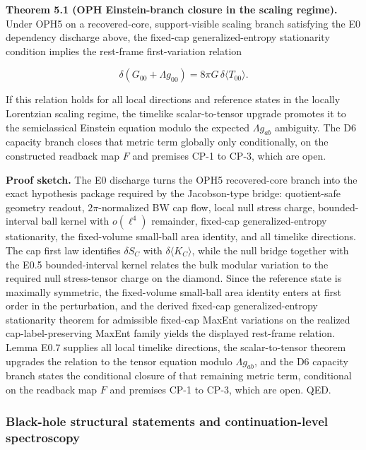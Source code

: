 \textbf{Theorem 5.1 (OPH Einstein-branch closure in the scaling regime).} Under OPH5 on a recovered-core, support-visible scaling branch satisfying the E0 dependency discharge above, the fixed-cap generalized-entropy stationarity condition implies the rest-frame first-variation relation

\[
\delta\!\left(G_{00}+\Lambda g_{00}\right)=8\pi G\,\delta\langle T_{00}\rangle.
\]

If this relation holds for all local directions and reference states in the locally Lorentzian scaling regime, the timelike scalar-to-tensor upgrade promotes it to the semiclassical Einstein equation modulo the expected \(\Lambda g_{ab}\) ambiguity. The D6 capacity branch closes that metric term globally only conditionally, on the constructed readback map \(F\) and premises CP-1 to CP-3, which are open.

\textbf{Proof sketch.} The E0 discharge turns the OPH5 recovered-core branch into the exact hypothesis package required by the Jacobson-type bridge: quotient-safe geometry readout, \(2\pi\)-normalized BW cap flow, local null stress charge, bounded-interval ball kernel with \(o(\ell^4)\) remainder, fixed-cap generalized-entropy stationarity, the fixed-volume small-ball area identity, and all timelike directions. The cap first law identifies \(\delta S_C\) with \(\delta\langle K_C\rangle\), while the null bridge together with the E0.5 bounded-interval kernel relates the bulk modular variation to the required null stress-tensor charge on the diamond. Since the reference state is maximally symmetric, the fixed-volume small-ball area identity enters at first order in the perturbation, and the derived fixed-cap generalized-entropy stationarity theorem for admissible fixed-cap MaxEnt variations on the realized cap-label-preserving MaxEnt family yields the displayed rest-frame relation. Lemma E0.7 supplies all local timelike directions, the scalar-to-tensor theorem upgrades the relation to the tensor equation modulo \(\Lambda g_{ab}\), and the D6 capacity branch states the conditional closure of that remaining metric term, conditional on the readback map \(F\) and premises CP-1 to CP-3, which are open. QED.

\subsubsection{Black-hole structural statements and continuation-level spectroscopy}\label{511-discrete-horizon-area-spectrum-and-hawking-emission-established}

